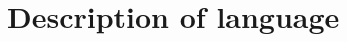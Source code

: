 \documentclass[conference,compsoc]{IEEEtran}
\begin{document}


\section{Description of language}
\label{sec:lang}


\end{document}
